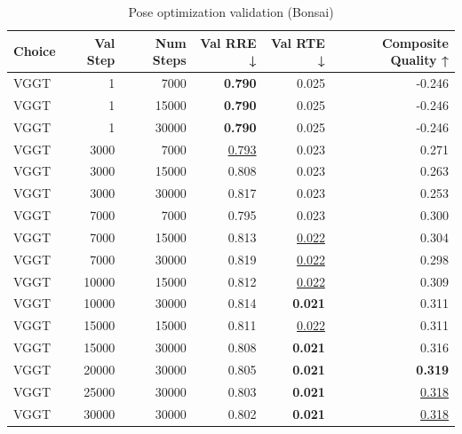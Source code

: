 \begin{table}[H]
\caption{Pose optimization validation (Bonsai)}
\label{tab:04_pose_opt_validation_bonsai}
\begin{tabular}{lrrrrr}
\toprule
Choice & Val Step & Num Steps & Val RRE ↓ & Val RTE ↓ & Composite Quality ↑ \\
\midrule
VGGT & 1 & 7000 & \textbf{0.790} & 0.025 & -0.246 \\
VGGT & 1 & 15000 & \textbf{0.790} & 0.025 & -0.246 \\
VGGT & 1 & 30000 & \textbf{0.790} & 0.025 & -0.246 \\
VGGT & 3000 & 7000 & \underline{0.793} & 0.023 & 0.271 \\
VGGT & 3000 & 15000 & 0.808 & 0.023 & 0.263 \\
VGGT & 3000 & 30000 & 0.817 & 0.023 & 0.253 \\
VGGT & 7000 & 7000 & 0.795 & 0.023 & 0.300 \\
VGGT & 7000 & 15000 & 0.813 & \underline{0.022} & 0.304 \\
VGGT & 7000 & 30000 & 0.819 & \underline{0.022} & 0.298 \\
VGGT & 10000 & 15000 & 0.812 & \underline{0.022} & 0.309 \\
VGGT & 10000 & 30000 & 0.814 & \textbf{0.021} & 0.311 \\
VGGT & 15000 & 15000 & 0.811 & \underline{0.022} & 0.311 \\
VGGT & 15000 & 30000 & 0.808 & \textbf{0.021} & 0.316 \\
VGGT & 20000 & 30000 & 0.805 & \textbf{0.021} & \textbf{0.319} \\
VGGT & 25000 & 30000 & 0.803 & \textbf{0.021} & \underline{0.318} \\
VGGT & 30000 & 30000 & 0.802 & \textbf{0.021} & \underline{0.318} \\
\bottomrule
\end{tabular}
\end{table}
